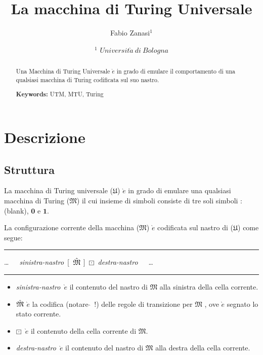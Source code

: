 \documentclass[a4paper]{article}
\title{La macchina di Turing Universale}
\author{Fabio Zanasi$^1$}
\date{
	$^1$ $Universit\grave{a}\ di\ Bologna$ 
}
\theoremstyle{plain}
\theoremstyle{definition}
\begin{document}
	\maketitle
	\begin{abstract}
		Una Macchina di Turing Universale $\grave{e}$ in grado di emulare il comportamento di una qualsiasi
		macchina di Turing codificata sul suo nastro.   
		
		\noindent\textbf{Keywords:} UTM, MTU, Turing
	\end{abstract}

	\tableofcontents
	
	\section{Descrizione}
	\label{sec:intro}
	
	\subsection{Struttura}
	\label{sec:pre}
	
La macchina di Turing universale ($\mathfrak{U}$) $\grave{e} $ in grado di emulare una 
qualsiasi macchina di Turing ($\mathfrak{M}$) il cui insieme di simboli consiste di tre soli simboli : 
\textvisiblespace (blank), $\mathbf{0}$ e $\mathbf{1}$.

La configurazione corrente della macchina ($\mathfrak{M}$)  $\grave{e}$ codificata sul
nastro di ($\mathfrak{U}$) come segue:
\vspace{5pt}
\begin{center}
\hrule
\vspace{2pt}
\ldots\ \textvisiblespace\ \textvisiblespace\ \textit{sinistra-nastro}\ [\ $\Hat{\mathfrak{M}}$ ]\ $\boxdot$\ \textit{destra-nastro}\ \textvisiblespace\ \textvisiblespace\ \ldots 
\vspace{2pt}
\hrule
\end{center}
\vspace{5pt}

\begin{itemize}
	\item \textit{sinistra-nastro}\ $\grave{e}$ il contenuto del nastro di $\mathfrak{M}$ alla sinistra della cella corrente.
	\item $\Hat{\mathfrak{M}}$ $\grave{e}$ la codifica (notare $\hat{}$\ !) delle regole di transizione per $\mathfrak{M}$ , ove $\grave{e}$ segnato lo stato corrente.
	\item $\boxdot$\ $\grave{e}$ il contenuto della cella corrente di $\mathfrak{M}$.
	\item \textit{destra-nastro}\ $\grave{e}$ il contenuto del nastro di $\mathfrak{M}$ alla destra della cella corrente.
  \end{itemize}
	
\end{document}
